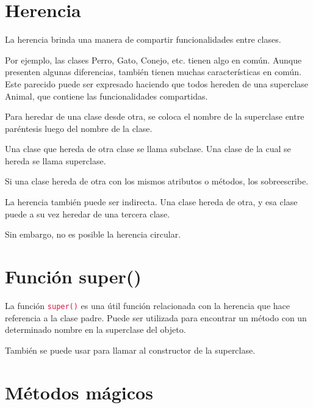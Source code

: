 \documentclass{report}
\newcommand{\ttt}[1]{
  \textcolor{Crimson}{\texttt{#1}}
}
\begin{document}

\section{Herencia}

La herencia brinda una manera de compartir funcionalidades entre clases.\smallskip

Por ejemplo, las clases Perro, Gato, Conejo, etc. tienen algo en común. Aunque presenten algunas diferencias, también tienen muchas características en común. Este parecido puede ser expresado haciendo que todos hereden de una superclase Animal, que contiene las funcionalidades compartidas.\smallskip

Para heredar de una clase desde otra, se coloca el nombre de la superclase entre paréntesis luego del nombre de la clase.


Una clase que hereda de otra clase se llama subclase. Una clase de la cual se hereda se llama superclase.\smallskip

Si una clase hereda de otra con los mismos atributos o métodos, los sobreescribe.


La herencia también puede ser indirecta. Una clase hereda de otra, y esa clase puede a su vez heredar de una tercera clase.


Sin embargo, no es posible la herencia circular.

\section{Función super()}

La función \ttt{super()} es una útil función relacionada con la herencia que hace referencia a la clase padre. Puede ser utilizada para encontrar un método con un determinado nombre en la superclase del objeto.


También se puede usar para llamar al constructor de la superclase.


\section{Métodos mágicos}
\end{document}
